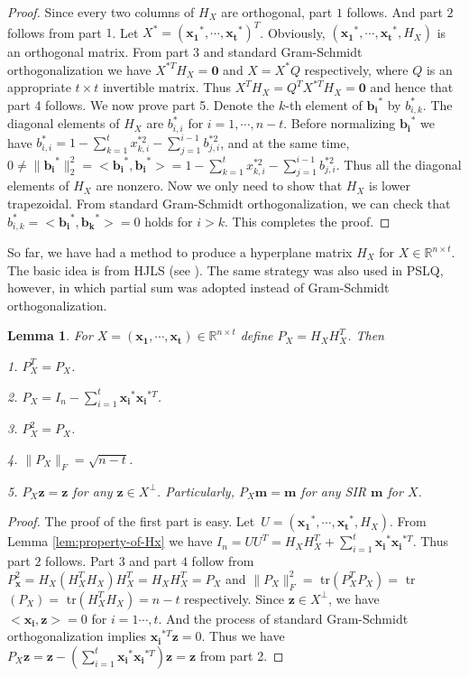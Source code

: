 \documentclass{sig-alternate}
\newtheorem{lem}[theorem]{Lemma}
\numberwithin{theorem}{section} \numberwithin{equation}{section}
\begin{document}
\begin{proof}
Since every two columns of $H_{X}$ are orthogonal, part $1$ follows.
And  part $2$ follows from part $1$. Let $X^* = (\mathbf{x_1}^*,
\cdots, \mathbf{x_t}^*)^T$. Obviously,
$(\mathbf{x_1}^*,\cdots,\mathbf{x_t}^*,H_{X})$ is an orthogonal
matrix. From part 3 and standard Gram-Schmidt orthogonalization we
have $X^{*T}H_{X} = \textbf{0}$ and $X = X^*Q$ respectively, where
$Q$ is an appropriate $t\times t$ invertible matrix. Thus $X^TH_{X}
= Q^TX^{*T}H_{X}= \textbf{0}$ and hence that part 4 follows. We now
prove part 5. Denote the $k$-th element of $\mathbf{b_i}^*$ by
$b_{i,k}^*$. The diagonal elements of $H_{X}$ are $b_{i,i}^{*}$ for
$i = 1, \cdots, n-t$. Before normalizing $\mathbf{b_i}^*$ we have $
b_{i,i}^* = 1 - \sum_{k=1}^{t}x_{k,i}^{*2} -
\sum_{j=1}^{i-1}b_{j,i}^{*2}$, and at the same time, $ 0 \neq
\|\mathbf{b_{i}}^*\|_2^2 = <\mathbf{b_{i}}^*, \mathbf{b_{i}}^*>
 = 1 - \sum_{k=1}^{t}x_{k,i}^{*2} - \sum_{j=1}^{i-1}b_{j,i}^{*2}.
$ Thus all the diagonal elements of $H_{X}$ are nonzero. Now we only
need to show that $H_{X}$ is lower trapezoidal. From standard
Gram-Schmidt orthogonalization, we can check that $b_{i,k}^* =
<\mathbf{b_i}^*, \mathbf{b_k}^*> = 0$ holds for $i> k$. This
completes the proof.
\end{proof}

So far, we have had a method to produce a hyperplane matrix $H_X$
for $X \in \mathbb{R}^{n\times t}$. The basic idea is from HJLS
(see \cite{HHL1986, HJL1989}). The same strategy was also used in
PSLQ, however, in which partial sum was adopted instead of
Gram-Schmidt orthogonalization.

\begin{lem}\label{lem:property-of-Px}
For $X = (\mathbf{x_1}, \cdots, \mathbf{x_t})\in\mathbb{R}^{n\times
t}$ define $P_{X} = H_{X} H_{X}^T$. Then


1. $P_{X}^T = P_{X}$.


2. $P_{X} = I_n - \sum_{i=1}^t\mathbf{x_i}^* \mathbf{x_i}^{*T}$.


3. $P_{X}^2 = P_{X}$.


4. $\|P_{X}\|_F = \sqrt{n-t}$.


5. $P_{X} \mathbf{z} = \mathbf{z}$ for any $\mathbf{z} \in X^\perp$.
Particularly, $P_{X} \mathbf{m} = \mathbf{m}$ for any SIR
$\mathbf{m}$ for $X$.
\end{lem}

\begin{proof}
The proof of the first part is easy. Let~$U = (\mathbf{x_1}^*,
\cdots, \mathbf{x_t}^*, H_{X})$. From Lemma \ref{lem:property-of-Hx}
we have
 $I_n=UU^T= H_{X} H_{X}^T
 + \sum_{i=1}^t\mathbf{x_i}^* \mathbf{x_i}^{*T}$. Thus part $2$
follows. Part $3$ and part $4$ follow from
$P_{\textbf{x}}^2 = H_{X}(H_{X}^TH_{X})H_{X}^T = H_{X}H_{X}^T = P_{X}$
and $\|P_{X}\|_F^2 =$ tr$(P_{X}^T P_{X}) =$ tr$(P_{X}) = $
tr$(H_{X}^T H_{X}) = n - t$ respectively. Since $\mathbf{z} \in
X^\perp$, we have $<\mathbf{x_i}, \mathbf{z}> = 0$ for $i = 1
\cdots, t$. And the process of standard Gram-Schmidt
orthogonalization implies $\mathbf{x_i}^{*T} \mathbf{z} = 0$. Thus
we have $P_{X} \mathbf{z} = \mathbf{z} - (\sum_{i=1}^t\mathbf{x_i}^*
\mathbf{x_i}^{*T})\mathbf{z} = \mathbf{z}$ from part 2.
\end{proof}
\end{document}
